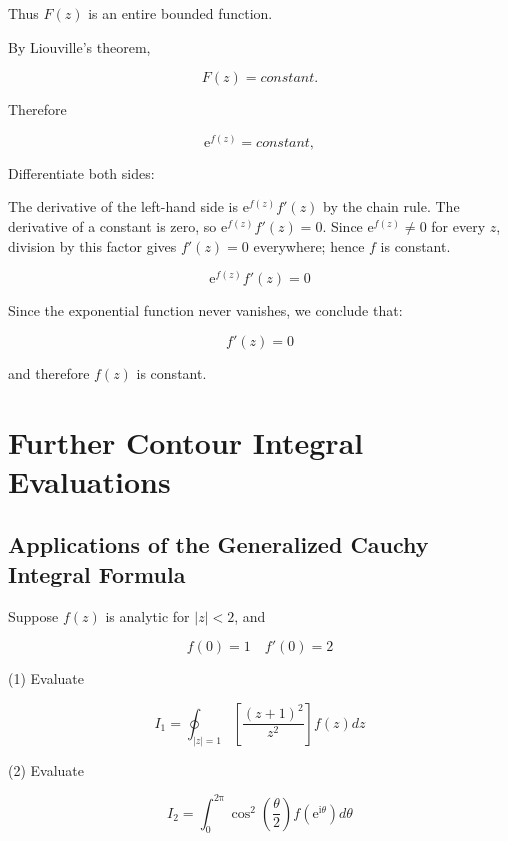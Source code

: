 \documentclass[11pt,a4paper]{article}
\theoremstyle{definition}
\theoremstyle{plain}
\begin{document}
Thus $F(z)$ is an entire bounded function.

By Liouville's theorem,

\begin{equation}
F(z) = constant.
\end{equation}

Therefore

\begin{equation}
\mathrm{e}^{f(z)} = constant,
\end{equation}

Differentiate both sides:

The derivative of the left-hand side is $\mathrm{e}^{f(z)}f'(z)$ by the chain rule. The derivative of a constant is zero, so $\mathrm{e}^{f(z)}f'(z) = 0$. Since $\mathrm{e}^{f(z)} \ne 0$ for every $z$, division by this factor gives $f'(z) = 0$ everywhere; hence $f$ is constant.

\begin{equation}
\mathrm{e}^{f(z)}f'(z) = 0
\end{equation}

Since the exponential function never vanishes, we conclude that:

\begin{equation}
f'(z) = 0
\end{equation}

and therefore $f(z)$ is constant.

\section{Further Contour Integral Evaluations}

\subsection{Applications of the Generalized Cauchy Integral Formula}

Suppose $f(z)$ is analytic for $\vert{}z\vert{} < 2$, and

\begin{equation}
f(0) = 1\quad f'(0) = 2
\end{equation}

(1) Evaluate

\begin{equation}
I_{1} = \oint_{\vert{}z\vert{} = 1}[\frac{{(z + 1)}^{2}}{z^{2}}]f(z)dz
\end{equation}

(2) Evaluate

\begin{equation}
I_{2} = \int_{0}^{2\mathrm{\pi}}\cos^{2}\left(\frac{\theta}{2}\right)f(\mathrm{e}^{\mathrm{i}\theta}) d\theta
\end{equation}
\end{document}
